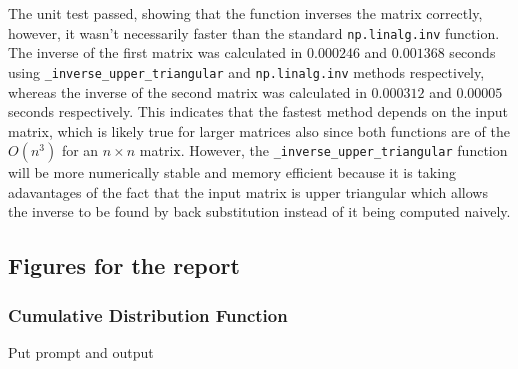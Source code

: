 The unit test passed, showing that the function inverses the matrix correctly, however, it wasn't necessarily faster than the standard \texttt{np.linalg.inv} function.
The inverse of the first matrix was calculated in $0.000246$ and $0.001368$ seconds using \texttt{\_inverse\_upper\_triangular} and \texttt{np.linalg.inv} methods respectively, whereas the inverse of the second matrix was calculated in $0.000312$ and $0.00005$ seconds respectively.
This indicates that the fastest method depends on the input matrix, which is likely true for larger matrices also since both functions are of the $O(n^3)$ for an $n \times n$ matrix.
However, the \texttt{\_inverse\_upper\_triangular} function will be more numerically stable and memory efficient because it is taking adavantages of the fact that the input matrix is upper triangular which allows the inverse to be found by back substitution instead of it being computed naively.
\FloatBarrier

\subsection{Figures for the report}
\subsubsection{Cumulative Distribution Function}
Put prompt and output
